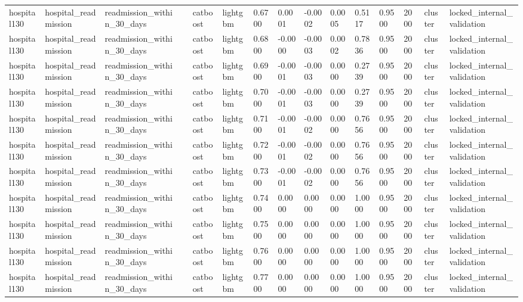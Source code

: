 \begin{tabular}{lllllllllllllll}
hospital130 & hospital\_readmission & readmission\_within\_30\_days &  & catboost & lightgbm & 0.6700 & 0.0001 & -0.0002 & 0.0005 & 0.5117 & 0.9500 & 2000 & cluster & locked\_internal\_validation \\
hospital130 & hospital\_readmission & readmission\_within\_30\_days &  & catboost & lightgbm & 0.6800 & -0.0000 & -0.0003 & 0.0002 & 0.7836 & 0.9500 & 2000 & cluster & locked\_internal\_validation \\
hospital130 & hospital\_readmission & readmission\_within\_30\_days &  & catboost & lightgbm & 0.6900 & -0.0001 & -0.0003 & 0.0000 & 0.2739 & 0.9500 & 2000 & cluster & locked\_internal\_validation \\
hospital130 & hospital\_readmission & readmission\_within\_30\_days &  & catboost & lightgbm & 0.7000 & -0.0001 & -0.0003 & 0.0000 & 0.2739 & 0.9500 & 2000 & cluster & locked\_internal\_validation \\
hospital130 & hospital\_readmission & readmission\_within\_30\_days &  & catboost & lightgbm & 0.7100 & -0.0001 & -0.0002 & 0.0000 & 0.7656 & 0.9500 & 2000 & cluster & locked\_internal\_validation \\
hospital130 & hospital\_readmission & readmission\_within\_30\_days &  & catboost & lightgbm & 0.7200 & -0.0001 & -0.0002 & 0.0000 & 0.7656 & 0.9500 & 2000 & cluster & locked\_internal\_validation \\
hospital130 & hospital\_readmission & readmission\_within\_30\_days &  & catboost & lightgbm & 0.7300 & -0.0001 & -0.0002 & 0.0000 & 0.7656 & 0.9500 & 2000 & cluster & locked\_internal\_validation \\
hospital130 & hospital\_readmission & readmission\_within\_30\_days &  & catboost & lightgbm & 0.7400 & 0.0000 & 0.0000 & 0.0000 & 1.0000 & 0.9500 & 2000 & cluster & locked\_internal\_validation \\
hospital130 & hospital\_readmission & readmission\_within\_30\_days &  & catboost & lightgbm & 0.7500 & 0.0000 & 0.0000 & 0.0000 & 1.0000 & 0.9500 & 2000 & cluster & locked\_internal\_validation \\
hospital130 & hospital\_readmission & readmission\_within\_30\_days &  & catboost & lightgbm & 0.7600 & 0.0000 & 0.0000 & 0.0000 & 1.0000 & 0.9500 & 2000 & cluster & locked\_internal\_validation \\
hospital130 & hospital\_readmission & readmission\_within\_30\_days &  & catboost & lightgbm & 0.7700 & 0.0000 & 0.0000 & 0.0000 & 1.0000 & 0.9500 & 2000 & cluster & locked\_internal\_validation \\

\end{tabular}
